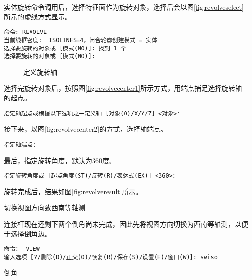 \begin{procedure}
实体旋转命令调用后，选择特征面作为旋转对象，选择后会以图\ref{fig:revolveselect}所示的虚线方式显示。
\begin{lstlisting}
命令: REVOLVE
当前线框密度:  ISOLINES=4，闭合轮廓创建模式 = 实体
选择要旋转的对象或 [模式(MO)]: 找到 1 个
选择要旋转的对象或 [模式(MO)]:
\end{lstlisting}

\begin{figure}[htbp]
\centering
{}\hspace{20pt}
\caption{定义旋转轴}
\end{figure}
选择完旋转对象后，按照图\ref{fig:revolvecenter1}所示方式，用端点捕足选择旋转轴的起点。
\begin{lstlisting}
指定轴起点或根据以下选项之一定义轴 [对象(O)/X/Y/Z] <对象>:
\end{lstlisting}
接下来，以图\ref{fig:revolvecenter2}的方式，选择轴端点。
\begin{lstlisting}
指定轴端点:
\end{lstlisting}
最后，指定旋转角度，默认为360度。
\begin{lstlisting}
指定旋转角度或 [起点角度(ST)/反转(R)/表达式(EX)] <360>:
\end{lstlisting}
旋转完成后，结果如图\ref{fig:revolveresult}所示。
\item 切换视图方向致西南等轴测

连接杆现在还剩下两个倒角尚未完成，因此先将视图方向切换为西南等轴测，以便于选择倒角边。
\begin{lstlisting}
命令: -VIEW
输入选项 [?/删除(D)/正交(O)/恢复(R)/保存(S)/设置(E)/窗口(W)]: swiso 
\end{lstlisting}

\begin{figure}[htbp]
\centering
\begin{floatrow}[2]
\end{floatrow}
\end{figure}
\item 倒角


\end{procedure}
